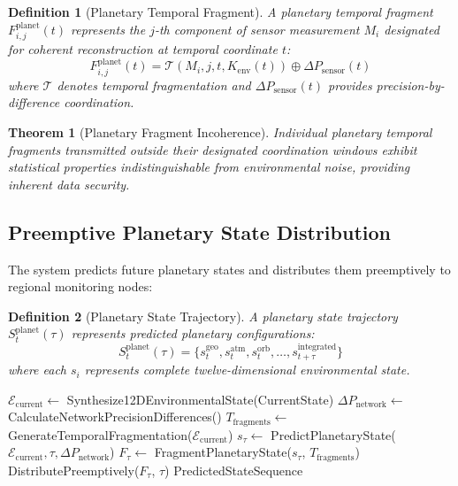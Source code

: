 \documentclass[12pt,a4paper]{article}
\newtheorem{theorem}{Theorem}
\newtheorem{definition}{Definition}
\begin{document}
\begin{definition}[Planetary Temporal Fragment]
A planetary temporal fragment $F_{i,j}^{\text{planet}}(t)$ represents the $j$-th component of sensor measurement $M_i$ designated for coherent reconstruction at temporal coordinate $t$:
\begin{equation}
F_{i,j}^{\text{planet}}(t) = \mathcal{T}(M_i, j, t, K_{\text{env}}(t)) \oplus \Delta P_{\text{sensor}}(t)
\end{equation}
where $\mathcal{T}$ denotes temporal fragmentation and $\Delta P_{\text{sensor}}(t)$ provides precision-by-difference coordination.
\end{definition}

\begin{theorem}[Planetary Fragment Incoherence]
Individual planetary temporal fragments transmitted outside their designated coordination windows exhibit statistical properties indistinguishable from environmental noise, providing inherent data security.
\end{theorem}

\subsection{Preemptive Planetary State Distribution}

The system predicts future planetary states and distributes them preemptively to regional monitoring nodes:

\begin{definition}[Planetary State Trajectory]
A planetary state trajectory $S_t^{\text{planet}}(\tau)$ represents predicted planetary configurations:
\begin{equation}
S_t^{\text{planet}}(\tau) = \{s_t^{\text{geo}}, s_t^{\text{atm}}, s_t^{\text{orb}}, \ldots, s_{t+\tau}^{\text{integrated}}\}
\end{equation}
where each $s_i$ represents complete twelve-dimensional environmental state.
\end{definition}

\begin{algorithm}
\caption{Preemptive Planetary State Generation}
\begin{algorithmic}
    \State $\mathcal{E}_{\text{current}} \leftarrow$ Synthesize12DEnvironmentalState(CurrentState)
    \State $\Delta P_{\text{network}} \leftarrow$ CalculateNetworkPrecisionDifferences()
    \State $T_{\text{fragments}} \leftarrow$ GenerateTemporalFragmentation($\mathcal{E}_{\text{current}}$)
        \State $s_{\tau} \leftarrow$ PredictPlanetaryState($\mathcal{E}_{\text{current}}, \tau, \Delta P_{\text{network}}$)
        \State $F_{\tau} \leftarrow$ FragmentPlanetaryState($s_{\tau}$, $T_{\text{fragments}}$)
        \State DistributePreemptively($F_{\tau}$, $\tau$)
    \EndFor
    \State \Return PredictedStateSequence
\EndProcedure
\end{algorithmic}
\end{algorithm}
\end{document}
